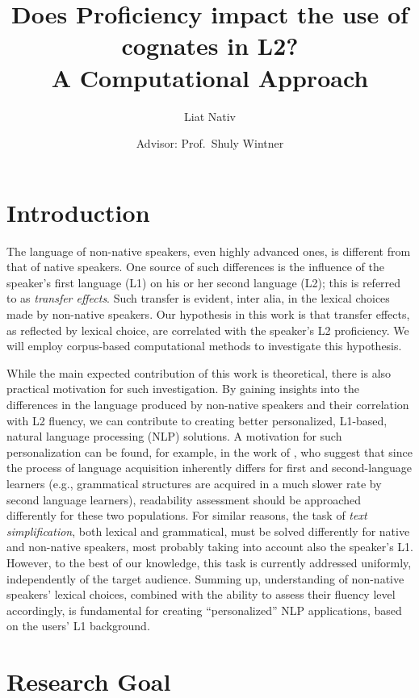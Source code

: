 \documentclass[11pt]{article}
\title{Does Proficiency impact the use of cognates in L2?\\[.5em]A Computational Approach}
\author{Liat Nativ \and Advisor: Prof.\ Shuly Wintner}
\date{}
\begin{document}
\maketitle
\thispagestyle{empty}

\section{Introduction}

The language of non-native speakers, even highly advanced ones, is different from that of native speakers. One source of such differences is the influence of the speaker's first language (L1) on his or her second language (L2); this is referred to as \emph{transfer effects}. Such transfer is evident, inter alia, in the lexical choices made by non-native speakers. 
%
Our hypothesis in this work is that transfer effects, as reflected by lexical choice, are correlated with the speaker's L2 proficiency. We will employ corpus-based computational methods to investigate this hypothesis.

While the main expected contribution of this work is theoretical, there is also practical motivation for such investigation. By gaining insights into the differences in the language produced by non-native speakers and their correlation with L2 fluency, we can contribute to creating better personalized, L1-based, natural language processing (NLP) solutions. 
A motivation for such personalization can be found, for example, in the work of \cite{heilman-etal-2007-combining},
who suggest that since the process of language 
acquisition inherently differs for first and second-language learners (e.g., grammatical structures are acquired in a much slower rate by second language learners), 
readability assessment should be approached differently for these two populations. 
For similar reasons, the task of \emph{text simplification}, both lexical and grammatical, must be solved differently for native and non-native speakers, most probably taking into account also the speaker's L1. However, to the best of our knowledge, this task is currently addressed uniformly, independently of the target audience.
Summing up, understanding of non-native speakers' lexical choices, combined with the ability to assess their fluency level accordingly,
is fundamental for creating ``personalized'' NLP applications, based on the users' L1 background.

\section{Research Goal}
\end{document}
